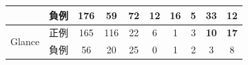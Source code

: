 \documentclass[T,J]{fose} %
\begin{document}
\begin{table}[]
{\begin{tabular}{l|l|c|c|c|ccc|c|c}
                          & 負例                     & 176                   & 59                      & 72                       & 12       & 16      & 5     & {\textbf{33}}  & 12                            \\ \hline
\multirow{2}{*}{Glance}   & 正例                     & 165                   & 116                     & 22                       & 6        & 1       & 3   & {\textbf{10}}    & {\textbf{17}}                            \\
                          & 負例                     & 56                    & 20                      & 25                       & 0        & 1       & 2   & 3    & 8  \\  \hline                        
\end{tabular}}

\vspace{4mm}



\end{table}
\end{document}
